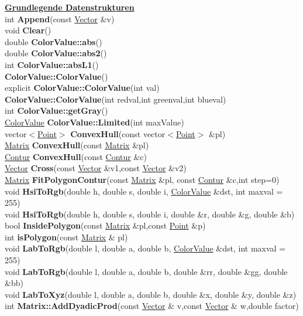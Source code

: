 \documentclass[10pt,titlepage]{article}
\newcommand{\subtitle}[1]{{\noindent\bf#1}}
\def\functionlistentry#1#2#3#4#5#6{\noindent #1 {\bf #2}(#3) \dotfill #6\\}
\begin{document}
{{\subtitle{\hyperlink{SECTION:datastructures}{Grundlegende Datenstrukturen}}\\
\functionlistentry{int}{Append}{const \hyperlink{Vector}{Vector} \&v}{266}{datastructures}{}
\functionlistentry{void}{Clear}{}{237}{datastructures}{}
\functionlistentry{double}{ColorValue::abs}{}{290}{datastructures}{}
\functionlistentry{double}{ColorValue::abs2}{}{291}{datastructures}{}
\functionlistentry{int}{ColorValue::absL1}{}{292}{datastructures}{}
\functionlistentry{}{ColorValue::ColorValue}{}{287}{datastructures}{}
\functionlistentry{explicit}{ColorValue::ColorValue}{int val}{288}{datastructures}{}
\functionlistentry{}{ColorValue::ColorValue}{int redval,int greenval,int blueval}{289}{datastructures}{}
\functionlistentry{int}{ColorValue::getGray}{}{293}{datastructures}{}
\functionlistentry{\hyperlink{ColorValue}{ColorValue}}{ColorValue::Limited}{int maxValue}{294}{datastructures}{}
\functionlistentry{vector$<$\hyperlink{Point}{Point}$>$}{ConvexHull}{const vector$<$\hyperlink{Point}{Point}$>$ \&pl}{284}{datastructures}{}
\functionlistentry{\hyperlink{Matrix}{Matrix}}{ConvexHull}{const \hyperlink{Matrix}{Matrix} \&pl}{285}{datastructures}{}
\functionlistentry{\hyperlink{Contur}{Contur}}{ConvexHull}{const \hyperlink{Contur}{Contur} \&c}{286}{datastructures}{}
\functionlistentry{\hyperlink{Vector}{Vector}}{Cross}{const \hyperlink{Vector}{Vector} \&v1,const \hyperlink{Vector}{Vector} \&v2}{254}{datastructures}{}
\functionlistentry{\hyperlink{Matrix}{Matrix}}{FitPolygonContur}{const \hyperlink{Matrix}{Matrix} \&pl, const \hyperlink{Contur}{Contur} \&c,int step=0}{283}{datastructures}{}
\functionlistentry{void}{HsiToRgb}{double h, double s, double i, \hyperlink{ColorValue}{ColorValue} \&dst, int maxval = 255}{303}{datastructures}{}
\functionlistentry{void}{HsiToRgb}{double h, double s, double i, double \&r, double \&g, double \&b}{307}{datastructures}{}
\functionlistentry{bool}{InsidePolygon}{const \hyperlink{Matrix}{Matrix} \&pl,const \hyperlink{Point}{Point} \&p}{280}{datastructures}{}
\functionlistentry{int}{isPolygon}{const \hyperlink{Matrix}{Matrix} \& pl}{279}{datastructures}{}
\functionlistentry{void}{LabToRgb}{double l, double a, double b, \hyperlink{ColorValue}{ColorValue} \&dst, int maxval = 255}{306}{datastructures}{}
\functionlistentry{void}{LabToRgb}{double l, double a, double b, double \&rr, double \&gg, double \&bb}{316}{datastructures}{}
\functionlistentry{void}{LabToXyz}{double l, double a, double b, double \&x, double \&y, double \&z}{314}{datastructures}{}
\functionlistentry{int}{Matrix::AddDyadicProd}{const \hyperlink{Vector}{Vector} \& v,const \hyperlink{Vector}{Vector} \& w,double factor}{276}{datastructures}{}
}}
\end{document}
